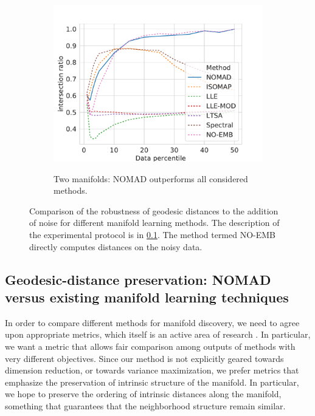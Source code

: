 \documentclass[twoside,11pt]{article}
\begin{document}
\begin{figure}
\begin{subfigure}{\textwidth}
\begin{footnotesize}
\begin{tabu}
		\includegraphics[width=\linewidth]{figures/geodesics/geodesics_moons_orthogonal_noise010} \\
    \end{tabu}
    \end{footnotesize}
    \caption{Two manifolds: NOMAD outperforms all considered methods.}
    \end{subfigure}
    
    \caption{Comparison of the robustness of geodesic distances to the addition of noise for different manifold learning methods. The description of the experimental protocol is in \cref{sec:geodesics}. The method termed NO-EMB directly computes distances on the noisy data.}
    \label{fig:distance_preservation}
\end{figure}

\subsection{Geodesic-distance preservation: NOMAD versus existing manifold learning techniques}
\label{sec:geodesics}

In order to compare different methods for manifold discovery, we need to agree upon appropriate metrics, which itself is an active area of research \citep[e.g.,][]{Zhang2012}. In particular, we want a metric that allows fair comparison among outputs of methods with very different objectives. Since our method is not explicitly geared towards dimension reduction, or towards variance maximization, we prefer metrics that emphasize the preservation of intrinsic structure of the manifold. In particular, we hope to preserve the ordering of intrinsic distances along the manifold, something that guarantees that the neighborhood structure remain similar. 
\end{document}
